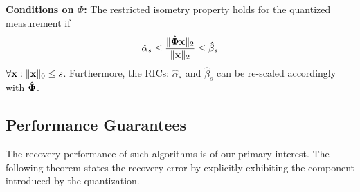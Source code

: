 \documentclass{article}
\begin{document}
 
{\bf Conditions on ${\Phi}$:} The restricted isometry property holds for the quantized measurement if
\begin{equation}
    \hat{\alpha}_{s} \leq \frac{\|\hat{{\bf \Phi}} {\bf x}\|_2}{\|{\bf x}\|_2} \leq \hat{\beta}_{s}
\end{equation}
$\forall {\bf x}: \| {\bf x}\|_0 \leq s$. Furthermore, the RICs: $\hat{\alpha}_s$ and $\hat{\beta}_s$ can be re-scaled accordingly with $\hat{\bf \Phi}$.

\vspace{-.8em}
\subsection{Performance Guarantees}
\vspace{-0.5em}
The recovery performance of such algorithms is of our primary interest. The following theorem states the recovery error by explicitly exhibiting the component introduced by the quantization.
\end{document}
